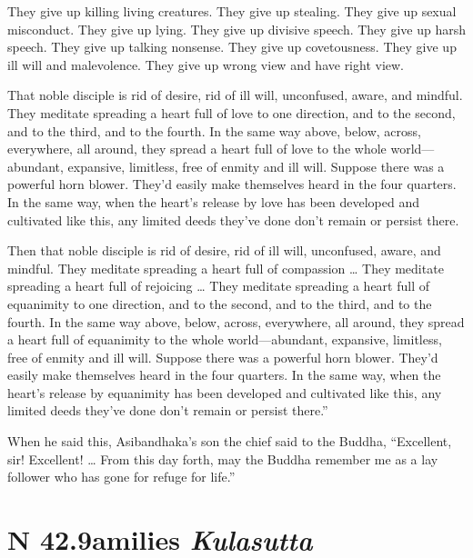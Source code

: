 \documentclass[12pt,openany]{book}%
\newcommand*{\suttatitleacronym}[1]{\smaller[2]{#1}\vspace*{.3em}}
\newcommand*{\suttatitletranslation}[1]{\linebreak{#1}}
\newcommand*{\suttatitleroot}[1]{\linebreak\smaller[2]\itshape{#1}}
\newcommand*{\tocacronym}[1]{\hspace*{-3.3em}{#1}\quad}
\newcommand*{\toctranslation}[1]{#1}
\newcommand*{\tocroot}[1]{(\textit{#1})}
\begin{document}
They give up killing living creatures. They give up stealing. They give up sexual misconduct. They give up lying. They give up divisive speech. They give up harsh speech. They give up talking nonsense. They give up covetousness. They give up ill will and malevolence. They give up wrong view and have right view. 

That noble disciple is rid of desire, rid of ill will, unconfused, aware, and mindful. They meditate spreading a heart full of love to one direction, and to the second, and to the third, and to the fourth. In the same way above, below, across, everywhere, all around, they spread a heart full of love to the whole world—abundant, expansive, limitless, free of enmity and ill will. Suppose there was a powerful horn blower. They’d easily make themselves heard in the four quarters. In the same way, when the heart’s release by love has been developed and cultivated like this, any limited deeds they’ve done don’t remain or persist there. 

Then that noble disciple is rid of desire, rid of ill will, unconfused, aware, and mindful. They meditate spreading a heart full of compassion … They meditate spreading a heart full of rejoicing … They meditate spreading a heart full of equanimity to one direction, and to the second, and to the third, and to the fourth. In the same way above, below, across, everywhere, all around, they spread a heart full of equanimity to the whole world—abundant, expansive, limitless, free of enmity and ill will. Suppose there was a powerful horn blower. They’d easily make themselves heard in the four quarters. In the same way, when the heart’s release by equanimity has been developed and cultivated like this, any limited deeds they’ve done don’t remain or persist there.” 

When he said this, Asibandhaka’s son the chief said to the Buddha, “Excellent, sir! Excellent! … From this day forth, may the Buddha remember me as a lay follower who has gone for refuge for life.” 

%
\section*{{\suttatitleacronym SN 42.9}{\suttatitletranslation Families }{\suttatitleroot Kulasutta}}
\addcontentsline{toc}{section}{\tocacronym{SN 42.9} \toctranslation{Families } \tocroot{Kulasutta}}
\end{document}
